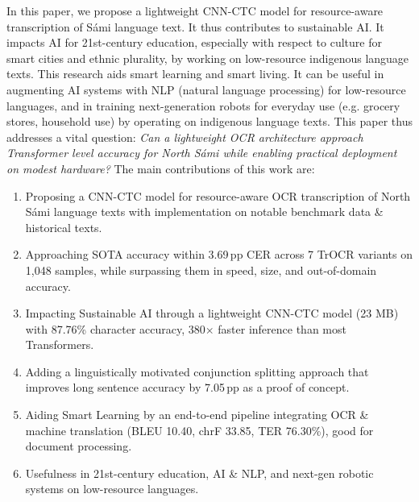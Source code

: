 \documentclass[conference]{IEEEtran}
\newcommand{\ctcCharAcc}{87.76}  %
\newcommand{\ctcSize}{23}
\newcommand{\speedupFactor}{380}
\newcommand{\testSamples}{1,048}
\newcommand{\splitImprovement}{7.05}
\newcommand{\bleuScore}{10.40}
\newcommand{\chrfScore}{33.85}
\newcommand{\terScore}{76.30}
\newcommand{\cerGap}{3.69}
\newcommand{\turiYear}{1910}
\begin{document}
In this paper, we propose a lightweight CNN-CTC model for resource-aware transcription of S\'{a}mi language text. It thus contributes to sustainable AI. It impacts AI for 21st-century education, especially with respect to culture for smart cities and ethnic plurality, by working on low-resource indigenous language texts. This research aids smart learning and smart living. It can be useful in augmenting AI systems with NLP (natural language processing) for low-resource languages, and in training next-generation robots for everyday use (e.g. grocery stores, household use) by operating on indigenous language texts. 
This paper thus addresses a vital question: \textit{Can a lightweight OCR architecture approach Transformer level accuracy for North S\'{a}mi while enabling practical deployment on modest hardware?} The main contributions of this work are:

\begin{enumerate}
    \item Proposing a CNN-CTC model for resource-aware OCR transcription of North S\'{a}mi language texts with implementation on notable benchmark data \& historical texts. %
    \item Approaching SOTA accuracy within \cerGap{}\,pp CER across 7 TrOCR variants on \testSamples{} samples, while surpassing them in speed, size, and out-of-domain accuracy.
    \item Impacting Sustainable AI through a lightweight CNN-CTC model (\ctcSize{} MB) with \ctcCharAcc\% character accuracy, \speedupFactor{}$\times$ faster inference than most Transformers.
    \item Adding a linguistically motivated conjunction splitting approach that improves long sentence accuracy by \splitImprovement{}\,pp as a proof of concept.
    \item Aiding Smart Learning by an end-to-end pipeline integrating OCR \& machine translation (BLEU \bleuScore{}, chrF \chrfScore{}, TER \terScore{}\%), good for document processing.  
    \item Usefulness in 21st-century education, AI \& NLP, and next-gen robotic systems on low-resource languages. 
\end{enumerate}
\end{document}
